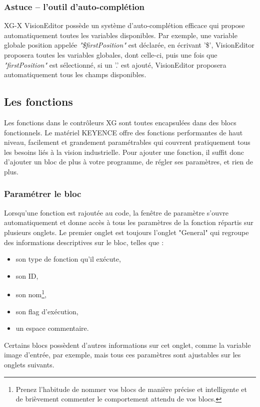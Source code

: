 \subsubsection{Astuce -- l'outil d'auto-complétion}
\label{Sec.Variables_AutoComplete}
XG-X VisionEditor possède un système d’auto-complétion efficace qui propose
automatiquement toutes les variables disponibles. Par exemple, une variable globale
position appelée \textit{"\$firstPosition"} est déclarée, en écrivant '\$',
VisionEditor proposera toutes les variables globales, dont celle-ci, puis une fois 
que \textit{"firstPosition"} est sélectionné, si un '.' est ajouté, VisionEditor
proposera automatiquement tous les champs disponibles.



\subsection{Les fonctions}
\label{Sec.Functions}
Les fonctions dans le contrôleurs XG sont toutes encapsulées dans des blocs
fonctionnels. Le matériel KEYENCE offre des fonctions performantes de haut niveau,
facilement et grandement paramétrables qui couvrent pratiquement tous les besoins liés
à la vision industrielle. Pour ajouter une fonction, il suffit donc d’ajouter un bloc
de plus à votre programme, de régler ses paramètres, et rien de plus.


\subsubsection{Paramétrer le bloc}
\label{Sec.Functions_InputParameters}
Lorsqu’une fonction est rajoutée au code, la fenêtre de paramètre s’ouvre automatiquement et donne accès à tous les paramètres de la fonction répartis sur plusieurs onglets.
Le premier onglet est toujours l’onglet "General" qui regroupe des informations descriptives sur le bloc, telles que :
\begin{itemize}
  \item son type de fonction qu’il exécute,
  \item son ID,
  \item son nom\footnote{Prenez l’habitude de nommer vos blocs de manière précise et intelligente et de brièvement commenter le comportement attendu de vos blocs. },
  \item son flag d’exécution,
  \item un espace commentaire.
\end{itemize}
\noindent Certains blocs possèdent d’autres informations sur cet onglet, comme la
variable image d’entrée, par exemple, mais tous ces paramètres sont ajustables sur 
les onglets suivants.
\vspace{0.2cm}

